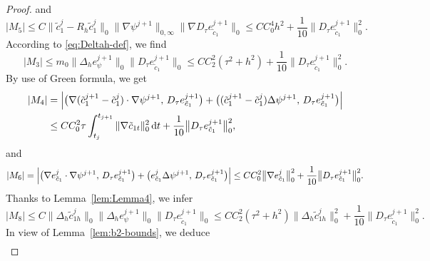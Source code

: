 \documentclass[a4paper,fleqn]{cas-sc}
\numberwithin{equation}{section}
\theoremstyle{definition}
\begin{document}
\begin{proof}
and
\begin{equation}\label{eq:4.70}
  |M_{5}|
  \leq C\bigl\|\tilde{c}_{1}^{j} - R_{h}\tilde{c}_{1}^{j}\bigr\|_{0}
         \bigl\|\nabla\psi^{j+1}\bigr\|_{0,\infty}
         \bigl\|\nabla D_{\tau}e_{\tilde{c}_{1}}^{j+1}\bigr\|_{0}
  \leq CC_{0}^{4}h^{2} + \frac{1}{10}\bigl\|D_{\tau}e_{\tilde{c}_{1}}^{j+1}\bigr\|_{0}^{2}.
\end{equation}
According to \eqref{eq:Deltah-def}, we find
\begin{equation}\label{eq:4.71}
  |M_{3}|
  \leq m_{0}\bigl\|\Delta_{h}e_{\psi}^{j+1}\bigr\|_{0}
             \bigl\|D_{\tau}e_{\tilde{c}_{1}}^{j+1}\bigr\|_{0}
  \leq CC_{2}^{2}(\tau^{2}+h^{2})
     + \frac{1}{10}\bigl\|D_{\tau}e_{\tilde{c}_{1}}^{j+1}\bigr\|_{0}^{2}.
\end{equation}
By use of Green formula, we get
\begin{align}
  |M_{4}|
  &= \Bigl|\bigl(\nabla(\tilde{c}_{1}^{j+1} - \tilde{c}_{1}^{j})\cdot\nabla\psi^{j+1},\,
                 D_{\tau}e_{\tilde{c}_{1}}^{j+1}\bigr)
          + \bigl((\tilde{c}_{1}^{j+1} - \tilde{c}_{1}^{j})\Delta\psi^{j+1},\,
                 D_{\tau}e_{\tilde{c}_{1}}^{j+1}\bigr)\Bigr|
  \nonumber\\
  &\leq CC_{0}^{2}\tau\int_{t_{j}}^{t_{j+1}}\|\nabla\tilde{c}_{1t}\|_{0}^{2}\,\mathrm{d}t
     + \frac{1}{10}\bigl\|D_{\tau}e_{\tilde{c}_{1}}^{j+1}\bigr\|_{0}^{2},
  \label{eq:4.72}
\end{align}
and
\begin{equation}\label{eq:4.73}
  |M_{6}|
  = \Bigl|\bigl(\nabla e_{\tilde{c}_{1}}^{j}\cdot\nabla\psi^{j+1},\,
               D_{\tau}e_{\tilde{c}_{1}}^{j+1}\bigr)
         + \bigl(e_{\tilde{c}_{1}}^{j}\Delta\psi^{j+1},\,
               D_{\tau}e_{\tilde{c}_{1}}^{j+1}\bigr)\Bigr|
  \leq CC_{0}^{2}\bigl\|\nabla e_{\tilde{c}_{1}}^{j}\bigr\|_{0}^{2}
     + \frac{1}{10}\bigl\|D_{\tau}e_{\tilde{c}_{1}}^{j+1}\bigr\|_{0}^{2}.
\end{equation}
Thanks to Lemma~\ref{lem:Lemma4}, we infer
\begin{equation}\label{eq:4.74}
  |M_{8}|
  \leq C\bigl\|\Delta_{h}\tilde{c}_{1h}^{j}\bigr\|_{0}
         \bigl\|\Delta_{h}e_{\psi}^{j+1}\bigr\|_{0}
         \bigl\|D_{\tau}e_{\tilde{c}_{1}}^{j+1}\bigr\|_{0}
  \leq CC_{2}^{2}(\tau^{2}+h^{2})\bigl\|\Delta_{h}\tilde{c}_{1h}^{j}\bigr\|_{0}^{2}
     + \frac{1}{10}\bigl\|D_{\tau}e_{\tilde{c}_{1}}^{j+1}\bigr\|_{0}^{2}.
\end{equation}
In view of Lemma~\ref{lem:b2-bounds}, we deduce
\begin{align}

\end{align}
\end{proof}
\end{document}
